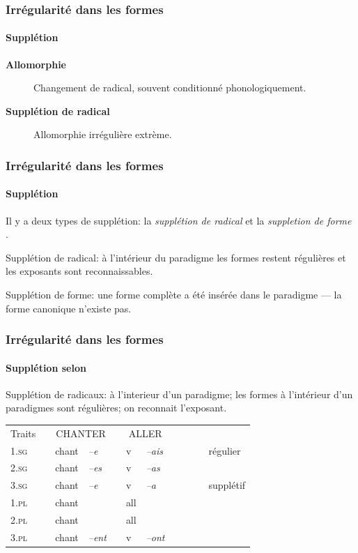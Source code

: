 \begin{frame}
\frametitle{Irrégularité dans les formes}
\framesubtitle{Supplétion}
\begin{description}
\item[{\bf Allomorphie}] Changement de radical, souvent conditionné phonologiquement.
\item[{\bf Supplétion de radical}] Allomorphie irrégulière extrème.
\end{description}
\end{frame}



\begin{frame}
\frametitle{Irrégularité dans les formes}
\framesubtitle{Supplétion}
\begin{wideitemize}
\item Il y a deux types de supplétion: la {\em supplétion de radical}
  et la {\em suppletion de forme} \cite{boye06}.
\item Supplétion de radical: à l'intérieur du paradigme les formes
  restent régulières et les exposants sont reconnaissables.
\item Supplétion de forme: une forme complète a été insérée dans le
  paradigme --- la forme canonique n'existe pas.
\end{wideitemize}
\end{frame}


\begin{frame}
\frametitle{Irrégularité dans les formes}
\framesubtitle{Supplétion selon \cite{boye06}}
Supplétion de radicaux:  à l'interieur d'un paradigme; les formes à
l'intérieur d'un paradigmes sont régulières; on reconnait l'exposant.

\scriptsize
\begin{table}
\begin{tabular}{|l|p{1mm}|ll|p{1mm}|ll|p{1mm}cl}
\cline{1-1}\cline{3-4}\cline{6-7}
Traits&&\multicolumn{2}{|c|}{\scriptsize{CHANTER}}&&\multicolumn{2}{|c|}{\scriptsize{ALLER}}&&\\
\cline{1-1}\cline{3-4}\cline{6-7}
\textsc{1.sg}&& chant& {\em --e}&&v& {\em
  --ais}&&\cellcolor{ciel}~~~&régulier\\
\cline{1-1}\cline{3-4}\cline{6-7}
\textsc{2.sg} &&chant&{\em --es}&&v& {\em --as}&&&\\
\cline{1-1}\cline{3-4}\cline{6-7}
\textsc{3.sg}&& chant&{\em --e}&&v& {\em
  --a}&&\cellcolor{mandarine}&supplétif\\
\cline{1-1}\cline{3-4}\cline{6-7}
\textsc{1.pl}&&chant&\cellcolor{ciel}{\em --ons}&&\cellcolor{mandarine} all& \cellcolor{ciel}{\em --ons}&&\\
\cline{1-1}\cline{3-4}\cline{6-7}
\textsc{2.pl}&&chant& \cellcolor{ciel}{\em --ez}&&\cellcolor{mandarine} all& \cellcolor{ciel}{\em --ez}&&\\
\cline{1-1}\cline{3-4}\cline{6-7}
\textsc{3.pl}&&chant& {\em --ent}&&v& {\em --ont}&&\\
\cline{1-1}\cline{3-4}\cline{6-7}
\end{tabular}\\[1mm]
\end{table}
\end{frame}


